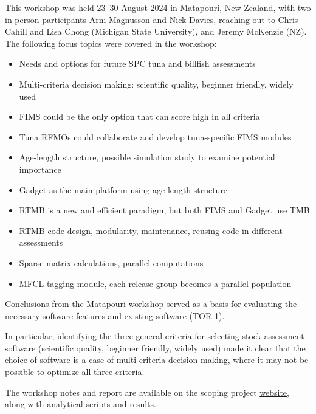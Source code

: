 \documentclass{SCreport}
\newcommand\tree
{https://github.com/PacificCommunity/ofp-sam-transition-plan/tree/main}
\begin{document}
\vspace{1ex}

This workshop was held 23--30 August 2024 in Matapouri, New Zealand, with two
in-person participants Arni Magnusson and Nick Davies, reaching out to Chris
Cahill and Lisa Chong (Michigan State University), and Jeremy McKenzie (NZ). The
following focus topics were covered in the workshop:

\begin{itemize}
  \item Needs and options for future SPC tuna and billfish assessments
  \item Multi-criteria decision making: scientific quality, beginner friendly,
  widely used
  \item FIMS could be the only option that can score high in all criteria
  \item Tuna RFMOs could collaborate and develop tuna-specific FIMS modules
  \item Age-length structure, possible simulation study to examine potential
  importance
  \item Gadget as the main platform using age-length structure
  \item RTMB is a new and efficient paradigm, but both FIMS and Gadget use TMB
  \item RTMB code design, modularity, maintenance, reusing code in different
  assessments
  \item Sparse matrix calculations, parallel computations
  \item MFCL tagging module, each release group becomes a parallel population
\end{itemize}

\vspace{1ex}

Conclusions from the Matapouri workshop served as a basis for evaluating the
necessary software features and existing software (TOR 1).

In particular, identifying the three general criteria for selecting stock
assessment software (scientific quality, beginner friendly, widely used) made it
clear that the choice of software is a case of multi-criteria decision making,
where it may not be possible to optimize all three criteria.

The workshop notes and report are available on the scoping project
\href{\tree/workshops/2024-08-matapouri}{website}, along with analytical scripts
and results.

\vspace{2ex}
\end{document}
